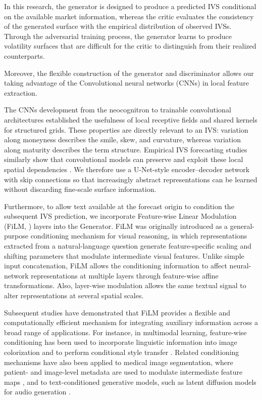 In this research, the generator is designed to produce a predicted IVS conditional on the available market information, whereas the critic evaluates the consistency of the generated surface with the empirical distribution of observed IVSs. Through the adversarial training process, the generator learns to produce volatility surfaces that are difficult for the critic to distinguish from their realized counterparts.


Moreover, the flexible construction of the generator and discriminator allows our taking advantage of the Convolutional neural networks (CNNs) in local feature extraction.


The CNNs development from the neocognitron \citep{fukushima1980neocognitron} to trainable convolutional architectures \citep{lecun1989backpropagation,lecun1998gradient} established the usefulness of local receptive fields and shared kernels for structured grids. These properties are directly relevant to an IVS: variation along moneyness describes the smile, skew, and curvature, whereas variation along maturity describes the term structure. Empirical IVS forecasting studies similarly show that convolutional models can preserve and exploit these local spatial dependencies \citep{medvedev2022multistep,shao2025prediction}. We therefore use a U-Net-style encoder--decoder network with skip connections \citep{ronneberger2015unet} so that increasingly abstract representations can be learned without discarding fine-scale surface information.


Furthermore, to allow text available at the forecast origin to condition the subsequent IVS prediction, we incorporate Feature-wise Linear Modulation (FiLM, \citep{perez2018film}) layers into the Generator. FiLM was originally introduced as a general-purpose conditioning mechanism for visual reasoning, in which representations extracted from a natural-language question generate feature-specific scaling and shifting parameters that modulate intermediate visual features. Unlike simple input concatenation, FiLM allows the conditioning information to affect neural-network representations at multiple layers through feature-wise affine transformations. Also, layer-wise modulation allows the same textual signal to alter representations at several spatial scales.



Subsequent studies have demonstrated that FiLM provides a flexible and computationally efficient mechanism for integrating auxiliary information across a broad range of applications. For instance, in multimodal learning, feature-wise conditioning has been used to incorporate linguistic information into image colorization \citep{manjunatha2018learning} and to perform conditional style transfer \citep{dumoulin2016learned}. Related conditioning mechanisms have also been applied to medical image segmentation, where patient- and image-level metadata are used to modulate intermediate feature maps \citep{lemay2021benefits}, and to text-conditioned generative models, such as latent diffusion models for audio generation \citep{liu2023audioldm}.


